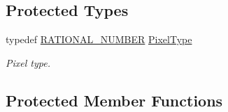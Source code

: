 \subsection*{Protected Types}
\begin{DoxyCompactItemize}
\item 
typedef \hyperlink{namespace_utilities_a40969b96bd8d847b962e297cb79f08ce}{RATIONAL\_\-NUMBER} \hyperlink{classg_virtual_x_ray_1_1_x_ray_renderer_a1337efbad4ecdc7ea0054b187590596d}{PixelType}
\begin{DoxyCompactList}\small\item\em Pixel type. \end{DoxyCompactList}\end{DoxyCompactItemize}
\subsection*{Protected Member Functions}
